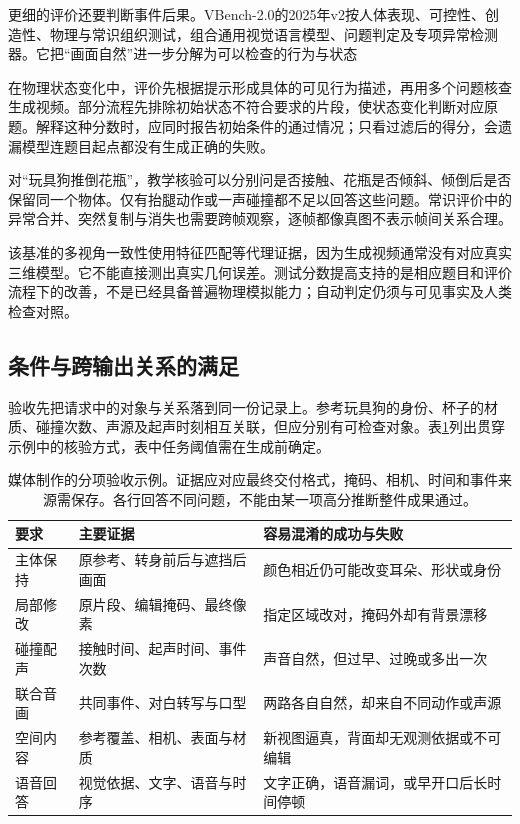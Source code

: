 更细的评价还要判断事件后果。VBench-2.0的2025年v2按人体表现、可控性、创造性、物理与常识组织测试，组合通用视觉语言模型、问题判定及专项异常检测器。它把“画面自然”进一步分解为可以检查的行为与状态

在物理状态变化中，评价先根据提示形成具体的可见行为描述，再用多个问题核查生成视频。部分流程先排除初始状态不符合要求的片段，使状态变化判断对应原题。解释这种分数时，应同时报告初始条件的通过情况；只看过滤后的得分，会遗漏模型连题目起点都没有生成正确的失败。

对“玩具狗推倒花瓶”，教学核验可以分别问是否接触、花瓶是否倾斜、倾倒后是否保留同一个物体。仅有抬腿动作或一声碰撞都不足以回答这些问题。常识评价中的异常合并、突然复制与消失也需要跨帧观察，逐帧都像真图不表示帧间关系合理。

该基准的多视角一致性使用特征匹配等代理证据，因为生成视频通常没有对应真实三维模型。它不能直接测出真实几何误差。测试分数提高支持的是相应题目和评价流程下的改善，不是已经具备普遍物理模拟能力；自动判定仍须与可见事实及人类检查对照。

\subsection{条件与跨输出关系的满足}
\label{sec:vision-multigen-relations}

验收先把请求中的对象与关系落到同一份记录上。参考玩具狗的身份、杯子的材质、碰撞次数、声源及起声时刻相互关联，但应分别有可检查对象。表\ref{tab:vision-media-acceptance}列出贯穿示例中的核验方式，表中任务阈值需在生成前确定。

\begin{table}[htbp]
 \centering
 \small
 \begin{tabularx}{\linewidth}{@{}p{25mm}p{44mm}X@{}}
  \toprule
  要求 & 主要证据 & 容易混淆的成功与失败 \\
  \midrule
  主体保持 & 原参考、转身前后与遮挡后画面 & 颜色相近仍可能改变耳朵、形状或身份 \\
  局部修改 & 原片段、编辑掩码、最终像素 & 指定区域改对，掩码外却有背景漂移 \\
  碰撞配声 & 接触时间、起声时间、事件次数 & 声音自然，但过早、过晚或多出一次 \\
  联合音画 & 共同事件、对白转写与口型 & 两路各自自然，却来自不同动作或声源 \\
  空间内容 & 参考覆盖、相机、表面与材质 & 新视图逼真，背面却无观测依据或不可编辑 \\
  语音回答 & 视觉依据、文字、语音与时序 & 文字正确，语音漏词，或早开口后长时间停顿 \\
  \bottomrule
 \end{tabularx}
 \caption{媒体制作的分项验收示例。证据应对应最终交付格式，掩码、相机、时间和事件来源需保存。各行回答不同问题，不能由某一项高分推断整件成果通过。}
 \label{tab:vision-media-acceptance}
\end{table}
\FloatBarrier

